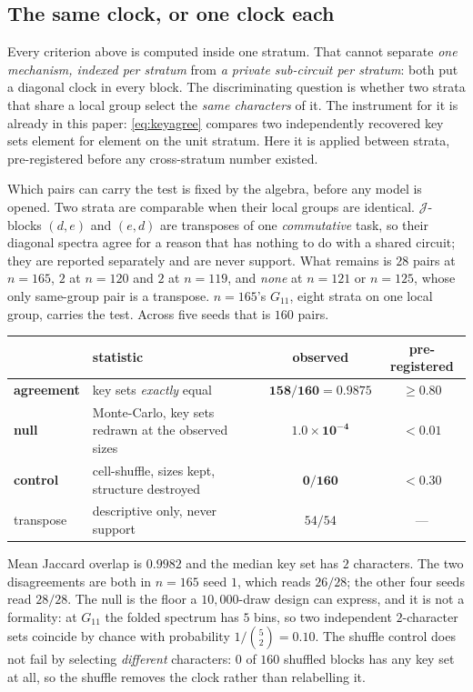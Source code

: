 \subsection{The same clock, or one clock each}
\label{sec:strata-sameness}

Every criterion above is computed inside one stratum. That cannot separate \emph{one
mechanism, indexed per stratum} from \emph{a private sub-circuit per stratum}: both put a
diagonal clock in every block. The discriminating question is whether two strata that share
a local group select the \emph{same characters} of it. The instrument for it is already in
this paper: \eqref{eq:keyagree} compares two independently recovered key sets element
for element on the unit stratum. Here it is applied between strata, pre-registered before
any cross-stratum number existed.

Which pairs can carry the test is fixed by the algebra, before any model is opened.
Two strata are comparable when their local groups are identical. $\mathcal{J}$-blocks
$(d,e)$ and $(e,d)$ are transposes of one \emph{commutative} task, so their diagonal spectra
agree for a reason that has nothing to do with a shared circuit; they are reported
separately and are never support. What remains is $28$ pairs at $n = 165$, $2$ at $n = 120$
and $2$ at $n = 119$, and \emph{none} at $n = 121$ or $n = 125$, whose only same-group
pair is a transpose. $n = 165$'s $G_{11}$, eight strata on one local group, carries the test.
Across five seeds that is $160$ pairs.

\begin{center}
\begin{tabular}{llcc}
  \toprule
  & statistic & observed & pre-registered \\
  \midrule
  \textbf{agreement} & key sets \emph{exactly} equal & $\mathbf{158/160 = 0.9875}$ & $\ge 0.80$ \\
  \textbf{null} & Monte-Carlo, key sets redrawn at the observed sizes & $\mathbf{1.0 \times 10^{-4}}$ & $< 0.01$ \\
  \textbf{control} & cell-shuffle, sizes kept, structure destroyed & $\mathbf{0/160}$ & $< 0.30$ \\
  transpose & descriptive only, never support & $54/54$ & --- \\
  \bottomrule
\end{tabular}
\end{center}

\noindent
Mean Jaccard overlap is $0.9982$ and the median key set has $2$ characters. The two
disagreements are both in $n = 165$ seed $1$, which reads $26/28$; the other four seeds read
$28/28$. The null is the floor a $10{,}000$-draw design can express, and it is not a formality:
at $G_{11}$ the folded spectrum has $5$ bins, so two independent $2$-character sets coincide
by chance with probability $1/\binom{5}{2} = 0.10$. The shuffle control does not fail by
selecting \emph{different} characters: $0$ of $160$ shuffled blocks has any key set at all,
so the shuffle removes the clock rather than relabelling it.

